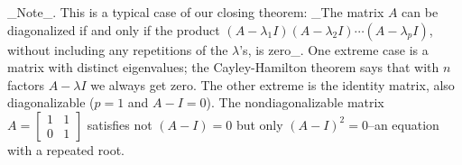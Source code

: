 _Note_. This is a typical case of our closing theorem: _The matrix \(A\) can be diagonalized if and only if the product \((A-\lambda_{1}I)(A-\lambda_{2}I)\cdots(A-\lambda_{p}I)\), without including any repetitions of the \(\lambda\)'s, is zero_. One extreme case is a matrix with distinct eigenvalues; the Cayley-Hamilton theorem says that with \(n\) factors \(A-\lambda I\) we always get zero. The other extreme is the identity matrix, also diagonalizable (\(p=1\) and \(A-I=0\)). The nondiagonalizable matrix \(A=\begin{bmatrix}1&1\\ 0&1\end{bmatrix}\) satisfies not \((A-I)=0\) but only \((A-I)^{2}=0\)--an equation with a repeated root.


